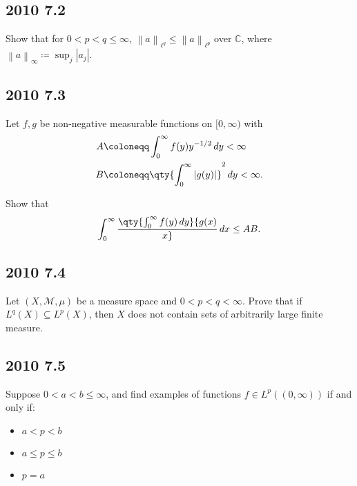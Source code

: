 \hypertarget{section-4}{%
\subsection{2010 7.2}\label{section-4}}

Show that for \(0 < p < q \leq \infty\),
\({\left\lVert {a} \right\rVert}_{\ell^q} \leq {\left\lVert {a} \right\rVert}_{\ell^p}\)
over \({\mathbb{C}}\), where
\({\left\lVert {a} \right\rVert}_{\infty } \coloneqq\sup_j {\left\lvert {a_j} \right\rvert}\).

\hypertarget{section-5}{%
\subsection{2010 7.3}\label{section-5}}

Let \(f, g\) be non-negative measurable functions on \([0, \infty)\)
with
\begin{align*}
A &\coloneqq\int_0^{\infty } f(y) y^{-1/2} \,dy< \infty \\
B &\coloneqq\qty{ \int_0^{\infty } {\left\lvert { g(y) } \right\rvert} }^2 \,dy< \infty  
.\end{align*}

Show that
\begin{align*}
\int_0^{\infty } \qty{ \int_0^{\infty } f(y) \,dy} {g(x) \over x} \,dx\leq AB
.\end{align*}

\hypertarget{section-6}{%
\subsection{2010 7.4}\label{section-6}}

Let \((X, \mathcal{M}, \mu)\) be a measure space and
\(0 < p < q< \infty\). Prove that if \(L^q(X) \subseteq L^p(X)\), then
\(X\) does not contain sets of arbitrarily large finite measure.

\hypertarget{section-7}{%
\subsection{2010 7.5}\label{section-7}}

Suppose \(0 < a < b \leq \infty\), and find examples of functions
\(f \in L^p((0, \infty ))\) if and only if:

\begin{itemize}
\item
  \(a < p < b\)
\item
  \(a \leq p \leq b\)
\item
  \(p = a\)
\end{itemize}

